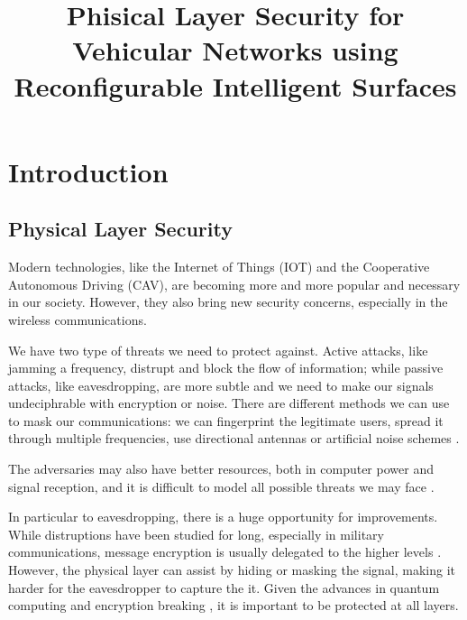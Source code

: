 \documentclass[conference]{IEEEtran}
\begin{document}
\title{Phisical Layer Security for Vehicular Networks using Reconfigurable Intelligent Surfaces}


\author{
}

\maketitle



\IEEEpeerreviewmaketitle

\section{Introduction}
\subsection{Physical Layer Security}

Modern technologies, like the Internet of Things (IOT) and the Cooperative Autonomous Driving (CAV), are becoming more and more popular and necessary in our society. However, they also bring new security concerns, especially in the wireless communications.

We have two type of threats we need to protect against. Active attacks, like jamming a frequency, distrupt and block the flow of information; while passive attacks, like eavesdropping, are more subtle and we need to make our signals undeciphrable with encryption or noise. There are different methods we can use to mask our communications: we can fingerprint the legitimate users, spread it through multiple frequencies, use directional antennas or artificial noise schemes \cite{5751298}.

The adversaries may also have better resources, both in computer power and signal reception, and it is difficult to model all possible threats we may face \cite{7120011}.

In particular to eavesdropping, there is a huge opportunity for improvements. While distruptions have been studied for long, especially in military communications, message encryption is usually delegated to the higher levels \cite{6739367}. However, the physical layer can assist by hiding or masking the signal, making it harder for the eavesdropper to capture the it. Given the advances in quantum computing and encryption breaking \cite{365700}, it is important to be protected at all layers.
\end{document}
